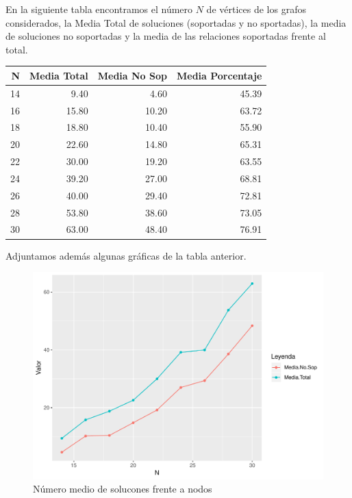 \documentclass[twoside,a4paper,openright,12pt,tikz]{book}
\begin{document}
En la siguiente tabla encontramos el número $N$ de vértices de los grafos considerados, la Media Total de soluciones (soportadas y no sportadas), la media de soluciones no soportadas y la media de las relaciones soportadas frente al total.
\begin{table}[ht]
\centering
\begin{tabular}{rrrr}
  \hline
N & Media Total & Media No Sop & Media Porcentaje \\ 
  \hline
  14 & 9.40 & 4.60 & 45.39 \\ 
  16 & 15.80 & 10.20 & 63.72 \\ 
  18 & 18.80 & 10.40 & 55.90 \\ 
  20 & 22.60 & 14.80 & 65.31 \\ 
  22 & 30.00 & 19.20 & 63.55 \\ 
  24 & 39.20 & 27.00 & 68.81 \\ 
  26 & 40.00 & 29.40 & 72.81 \\ 
  28 & 53.80 & 38.60 & 73.05 \\ 
  30 & 63.00 & 48.40 & 76.91 \\ 
   \hline
\end{tabular}
\end{table}

Adjuntamos además algunas gráficas de la tabla anterior.

\begin{figure}[h!]
\centering
\includegraphics[scale=0.7]{plot10}
\caption{Número medio de solucones frente a nodos}
\end{figure}
\end{document}
